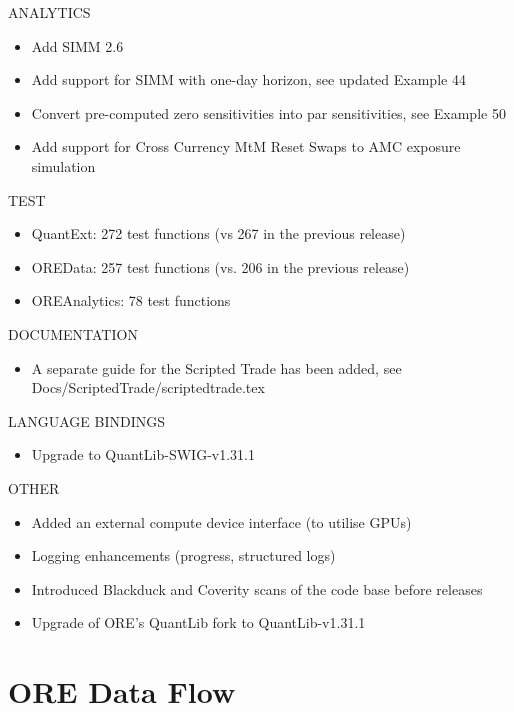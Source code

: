 \documentclass[12pt, a4paper]{article}
\begin{document}
\bigskip
ANALYTICS
\begin{itemize}
\item Add SIMM 2.6
\item Add support for SIMM with one-day horizon, see updated Example 44
\item Convert pre-computed zero sensitivities into par sensitivities, see Example 50 
\item Add support for Cross Currency MtM Reset Swaps to AMC exposure simulation
\end{itemize}

\bigskip
TEST
\begin{itemize}
\item QuantExt: 272 test functions (vs 267 in the previous release)
\item OREData: 257 test functions (vs. 206 in the previous release)
\item OREAnalytics: 78 test functions 
\end{itemize}

\bigskip
DOCUMENTATION
\begin{itemize}
\item A separate guide for the Scripted Trade has been added,
  see Docs/ScriptedTrade/scriptedtrade.tex
\end{itemize}

\bigskip
LANGUAGE BINDINGS
\begin{itemize}
\item Upgrade to QuantLib-SWIG-v1.31.1
\end{itemize}

\bigskip
OTHER
\begin{itemize}
\item Added an external compute device interface (to utilise GPUs)
\item Logging enhancements (progress, structured logs)
\item Introduced Blackduck and Coverity scans of the code base before releases
\item Upgrade of ORE's QuantLib fork to QuantLib-v1.31.1
\end{itemize}

\section{ORE Data Flow}\label{sec:process}
\end{document}
